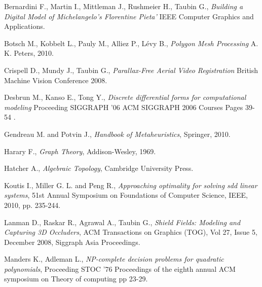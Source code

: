 \documentclass[conference,compsoc,a4paper]{IEEEtran}
\begin{document}
\renewcommand\refname{Referencias}

\begin{thebibliography}{1}

Bernardini F., Martin I., Mittleman J., Rushmeier H., Taubin G.,
\newblock \textit{Building a Digital Model of Michelangelo's Florentine Pieta'}
\newblock IEEE Computer Graphics and Applications.

Botsch M., Kobbelt L., Pauly M., Alliez P., Lévy B.,
\newblock \textit{Polygon Mesh Processing}
\newblock A. K. Peters, 2010.

Crispell D., Mundy J., Taubin G.,
\newblock \textit{Parallax-Free Aerial Video Registration}
\newblock British Machine Vision Conference 2008.

Desbrun M., Kanso E., Tong Y.,
\newblock \textit{Discrete differential forms for computational 
modeling}
\newblock Proceeding SIGGRAPH '06 ACM SIGGRAPH 2006 Courses Pages 
39-54 .
 
Gendreau M. and Potvin J., 
\newblock \textit{Handbook of Metaheuristics}, 
\newblock Springer, 2010.

Harary F., 
\newblock \textit{Graph Theory}, 
\newblock Addison-Wesley, 1969.

Hatcher A., 
\newblock \textit{Algebraic Topology}, 
\newblock Cambridge University Press.

Koutis I., Miller G. L. and Peng R., 
\newblock \textit{Approaching optimality for solving sdd linear systems}, 
\newblock 51st Annual Symposium on Foundations of Computer Science, IEEE, 
2010, pp. 235-244.

Lanman D., Raskar R., Agrawal A., Taubin G., 
\newblock \textit{Shield Fields: Modeling and Capturing 3D Occluders}, 
\newblock ACM Transactions on Graphics (TOG), Vol 27, Issue 5, December 
2008, Siggraph Asia Proceedings.

Manders 	K., Adleman L.,
\newblock \textit{NP-complete decision problems for quadratic polynomials},
\newblock Proceeding STOC '76 Proceedings of the eighth annual ACM symposium on Theory of computing
pp 23-29.


\end{thebibliography}
\end{document}
